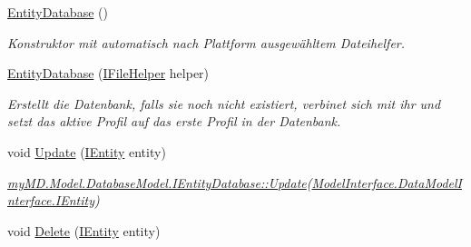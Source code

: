 \begin{CompactItemize}
\item 
\hyperlink{classmy_m_d_1_1_model_1_1_database_model_1_1_entity_database_e7a63762a30ee10ba8c323619eccd584}{Entity\-Database} ()
\begin{CompactList}\small\item\em Konstruktor mit automatisch nach Plattform ausgew\"{a}hltem Dateihelfer. \item\end{CompactList}\item 
\hyperlink{classmy_m_d_1_1_model_1_1_database_model_1_1_entity_database_81426df1f225a7d6a66b94c95a89122d}{Entity\-Database} (\hyperlink{interfacemy_m_d_1_1_model_1_1_file_helper_1_1_i_file_helper}{IFile\-Helper} helper)
\begin{CompactList}\small\item\em Erstellt die Datenbank, falls sie noch nicht existiert, verbinet sich mit ihr und setzt das aktive Profil auf das erste Profil in der Datenbank. \item\end{CompactList}\item 
\hypertarget{classmy_m_d_1_1_model_1_1_database_model_1_1_entity_database_bf510dc6cf79d153f564eca0f10971d2}{
void \hyperlink{classmy_m_d_1_1_model_1_1_database_model_1_1_entity_database_bf510dc6cf79d153f564eca0f10971d2}{Update} (\hyperlink{interfacemy_m_d_1_1_model_interface_1_1_data_model_interface_1_1_i_entity}{IEntity} entity)}
\label{dd/d77/classmy_m_d_1_1_model_1_1_database_model_1_1_entity_database_bf510dc6cf79d153f564eca0f10971d2}

\begin{CompactList}\small\item\em \hyperlink{interfacemy_m_d_1_1_model_1_1_database_model_1_1_i_entity_database_bf510dc6cf79d153f564eca0f10971d2}{my\-MD.Model.Database\-Model.IEntity\-Database::Update}(\hyperlink{interfacemy_m_d_1_1_model_interface_1_1_data_model_interface_1_1_i_entity}{Model\-Interface.Data\-Model\-Interface.IEntity}) \item\end{CompactList}\item 
\hypertarget{classmy_m_d_1_1_model_1_1_database_model_1_1_entity_database_1ec3022b27f9091440cb495f510d25b0}{
void \hyperlink{classmy_m_d_1_1_model_1_1_database_model_1_1_entity_database_1ec3022b27f9091440cb495f510d25b0}{Delete} (\hyperlink{interfacemy_m_d_1_1_model_interface_1_1_data_model_interface_1_1_i_entity}{IEntity} entity)}
\label{dd/d77/classmy_m_d_1_1_model_1_1_database_model_1_1_entity_database_1ec3022b27f9091440cb495f510d25b0}


\end{CompactItemize}
